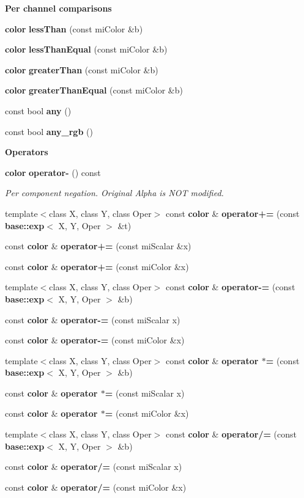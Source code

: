 \begin{Indent}{\bf Per channel comparisons}\par
\begin{CompactItemize}
\item 
{\bf color} {\bf less\-Than} (const mi\-Color \&b)
\item 
{\bf color} {\bf less\-Than\-Equal} (const mi\-Color \&b)
\item 
{\bf color} {\bf greater\-Than} (const mi\-Color \&b)
\item 
{\bf color} {\bf greater\-Than\-Equal} (const mi\-Color \&b)
\item 
const bool {\bf any} ()
\item 
const bool {\bf any\_\-rgb} ()
\end{CompactItemize}
\end{Indent}
\begin{Indent}{\bf Operators}\par
\begin{CompactItemize}
\item 
{\bf color} {\bf operator-} () const 
\begin{CompactList}\small\item\em Per component negation. Original Alpha is NOT modified. \item\end{CompactList}\item 
template$<$class X, class Y, class Oper$>$ const {\bf color} \& {\bf operator+=} (const {\bf base::exp}$<$ X, Y, Oper $>$ \&t)
\item 
const {\bf color} \& {\bf operator+=} (const mi\-Scalar \&x)
\item 
const {\bf color} \& {\bf operator+=} (const mi\-Color \&x)
\item 
template$<$class X, class Y, class Oper$>$ const {\bf color} \& {\bf operator-=} (const {\bf base::exp}$<$ X, Y, Oper $>$ \&b)
\item 
const {\bf color} \& {\bf operator-=} (const mi\-Scalar x)
\item 
const {\bf color} \& {\bf operator-=} (const mi\-Color \&x)
\item 
template$<$class X, class Y, class Oper$>$ const {\bf color} \& {\bf operator $\ast$=} (const {\bf base::exp}$<$ X, Y, Oper $>$ \&b)
\item 
const {\bf color} \& {\bf operator $\ast$=} (const mi\-Scalar x)
\item 
const {\bf color} \& {\bf operator $\ast$=} (const mi\-Color \&x)
\item 
template$<$class X, class Y, class Oper$>$ const {\bf color} \& {\bf operator/=} (const {\bf base::exp}$<$ X, Y, Oper $>$ \&b)
\item 
const {\bf color} \& {\bf operator/=} (const mi\-Scalar x)
\item 
const {\bf color} \& {\bf operator/=} (const mi\-Color \&x)
\end{CompactItemize}
\end{Indent}
